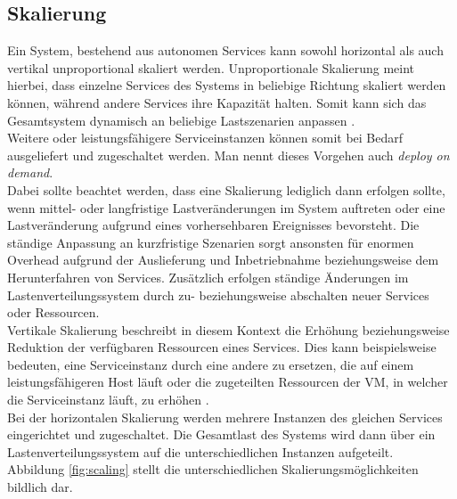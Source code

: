 \subsection{Skalierung}
\label{sec:scaling}
Ein System, bestehend aus autonomen Services kann sowohl horizontal als auch vertikal unproportional skaliert werden. Unproportionale Skalierung meint hierbei, dass einzelne Services des Systems in beliebige Richtung skaliert werden können, während andere Services ihre Kapazität halten. Somit kann sich das Gesamtsystem dynamisch an beliebige Lastszenarien anpassen \cite{NADAREISHVILI.2016}.\\
Weitere oder leistungsfähigere Serviceinstanzen können somit bei Bedarf ausgeliefert und zugeschaltet werden. Man nennt dieses Vorgehen auch \textit{deploy on demand}.\\
Dabei sollte beachtet werden, dass eine Skalierung lediglich dann erfolgen sollte, wenn mittel- oder langfristige Lastveränderungen im System auftreten oder eine Lastveränderung aufgrund eines vorhersehbaren Ereignisses bevorsteht. Die ständige Anpassung an kurzfristige Szenarien sorgt ansonsten für enormen Overhead aufgrund der Auslieferung und Inbetriebnahme beziehungsweise dem Herunterfahren von Services. Zusätzlich erfolgen ständige Änderungen im Lastenverteilungssystem durch zu- beziehungsweise abschalten neuer Services oder Ressourcen.\\
Vertikale Skalierung beschreibt in diesem Kontext die Erhöhung beziehungsweise Reduktion der verfügbaren Ressourcen eines Services. Dies kann beispielsweise bedeuten, eine Serviceinstanz durch eine andere zu ersetzen, die auf einem leistungsfähigeren Host läuft oder die zugeteilten Ressourcen der VM, in welcher die Serviceinstanz läuft, zu erhöhen \cite{NADAREISHVILI.2016}.\\
Bei der horizontalen Skalierung werden mehrere Instanzen des gleichen Services eingerichtet und zugeschaltet. Die Gesamtlast des Systems wird dann über ein Lastenverteilungssystem auf die unterschiedlichen Instanzen aufgeteilt.\\
Abbildung \ref{fig:scaling} stellt die unterschiedlichen Skalierungsmöglichkeiten bildlich dar.

